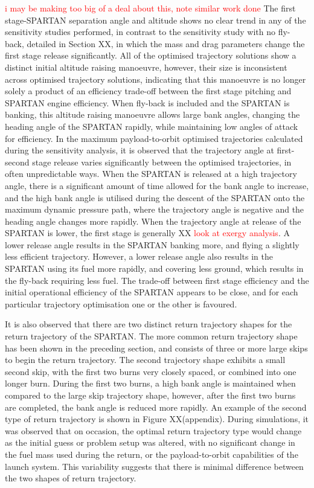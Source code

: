 \textcolor{red}{i may be making too big of a deal about this, note similar work done}
The first stage-SPARTAN separation angle and altitude shows no clear trend in any of the sensitivity studies performed, in contrast to the sensitivity study with no fly-back, detailed in Section XX, in which the mass and drag parameters change the first stage release significantly. All of the optimised trajectory solutions show a distinct initial altitude raising manoeuvre, however, their size is inconsistent across optimised trajectory solutions, indicating that this manoeuvre is no longer solely a product of an efficiency trade-off between the first stage pitching and SPARTAN engine efficiency. When fly-back is included and the SPARTAN is banking, this altitude raising manoeuvre allows large bank angles, changing the heading angle of the SPARTAN rapidly, while maintaining low angles of attack for efficiency. 
In the maximum payload-to-orbit optimised trajectories calculated during the sensitivity analysis, it is observed that the trajectory angle at first-second stage release varies significantly between the optimised trajectories, in often unpredictable ways. When the SPARTAN is released at a high trajectory angle, there is a significant amount of time allowed for the bank angle to increase, and the high bank angle is utilised during the descent of the SPARTAN onto the maximum dynamic pressure path, where the trajectory angle is negative and the heading angle changes more rapidly. 
When the trajectory angle at release of the SPARTAN is lower, the first stage is generally XX \textcolor{red}{look at exergy analysis}. A lower release angle results in the SPARTAN banking more, and flying a slightly less efficient trajectory. However, a lower release angle also results in the SPARTAN using its fuel more rapidly, and covering less ground, which results in the fly-back requiring less fuel. 
The trade-off between first stage efficiency and the initial operational efficiency of the SPARTAN appears to be close, and 
for each particular trajectory optimisation one or the other is favoured. 


It is also observed that there are two distinct return trajectory shapes for the return trajectory of the SPARTAN. The more common return trajectory shape has been shown in the preceding section, and consists of three or more large skips to begin the return trajectory. The second trajectory shape exhibits a small second skip, with the first two burns very closely spaced, or combined into one longer burn. During the first two burns, a high bank angle is maintained  when compared to the large skip trajectory shape, however, after the first two burns are completed, the bank angle is reduced more rapidly. 
An example of the second type of return trajectory is shown in Figure XX(appendix). 
During simulations, it was observed that on occasion, the optimal return trajectory type would change as the initial guess or problem setup was altered, with no significant change in the fuel mass used during the return, or the payload-to-orbit capabilities of the launch system. This variability suggests that there is minimal difference between the two shapes of return trajectory. 






